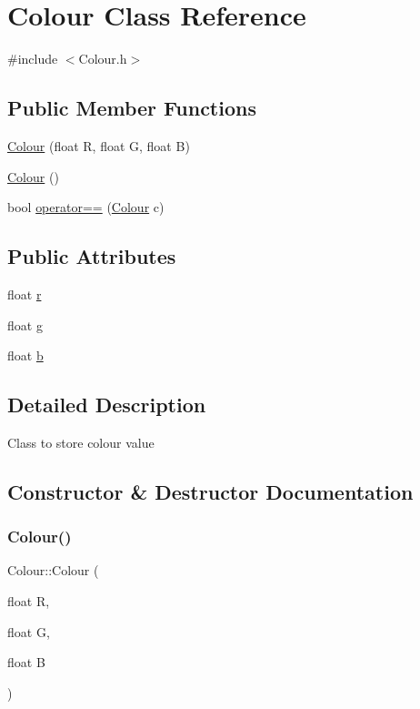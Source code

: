 \hypertarget{classColour}{}\section{Colour Class Reference}
\label{classColour}


{\ttfamily \#include $<$Colour.\+h$>$}

\subsection*{Public Member Functions}
\begin{DoxyCompactItemize}
\item 
\hyperlink{classColour_a15198315afb938e0fe97987c7d67e566}{Colour} (float R, float G, float B)
\item 
\hyperlink{classColour_a46612b9524fcd4cee818af6a86b7a4d2}{Colour} ()
\item 
bool \hyperlink{classColour_a27fe7a1109a5d2af2d3070d6712732ed}{operator==} (\hyperlink{classColour}{Colour} c)
\end{DoxyCompactItemize}
\subsection*{Public Attributes}
\begin{DoxyCompactItemize}
\item 
float \hyperlink{classColour_acb0b39e6e5e18b946732f51f126c8bf8}{r}
\item 
float \hyperlink{classColour_a25bdab33ddd5f646162329bfb8b23b75}{g}
\item 
float \hyperlink{classColour_aee312356ce76f9c54c9beecad919b421}{b}
\end{DoxyCompactItemize}


\subsection{Detailed Description}
Class to store colour value 

\subsection{Constructor \& Destructor Documentation}
\mbox{\label{classColour_a15198315afb938e0fe97987c7d67e566}} 
\subsubsection{\texorpdfstring{Colour()}{Colour()}\hspace{0.1cm}{\footnotesize\ttfamily [1/2]}}
{\footnotesize\ttfamily Colour\+::\+Colour (\begin{DoxyParamCaption}\item[{float}]{R,  }\item[{float}]{G,  }\item[{float}]{B }\end{DoxyParamCaption})}


